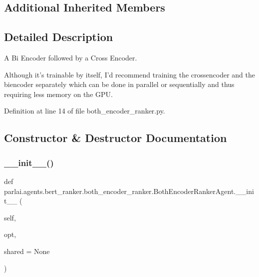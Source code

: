 \subsection*{Additional Inherited Members}


\subsection{Detailed Description}
\begin{DoxyVerb}A Bi Encoder followed by a Cross Encoder.

Although it's trainable by itself, I'd recommend training the crossencoder and the
biencoder separately which can be done in parallel or sequentially and thus
requiring less memory on the GPU.
\end{DoxyVerb}
 

Definition at line 14 of file both\+\_\+encoder\+\_\+ranker.\+py.



\subsection{Constructor \& Destructor Documentation}
\mbox{\label{classparlai_1_1agents_1_1bert__ranker_1_1both__encoder__ranker_1_1BothEncoderRankerAgent_a96d864d610277625195f71a615c0f585}} 
\subsubsection{\texorpdfstring{\+\_\+\+\_\+init\+\_\+\+\_\+()}{\_\_init\_\_()}}
{\footnotesize\ttfamily def parlai.\+agents.\+bert\+\_\+ranker.\+both\+\_\+encoder\+\_\+ranker.\+Both\+Encoder\+Ranker\+Agent.\+\_\+\+\_\+init\+\_\+\+\_\+ (\begin{DoxyParamCaption}\item[{}]{self,  }\item[{}]{opt,  }\item[{}]{shared = {\ttfamily None} }\end{DoxyParamCaption})}



